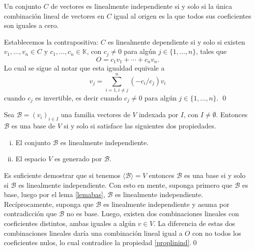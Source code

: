 \begin{prop}\label{proplinind}
Un conjunto $C$ de vectores es linealmente independiente si y solo si la única combinación lineal de vectores en $C$ igual al origen es la que todos sus coeficientes son iguales a cero.
\end{prop}

\dem Establecemos la contrapositiva: $C$ es linealmente dependiente si y solo si existen $v_1,\ldots,v_n\in C$ y $c_1,\ldots,c_n\in \mathbb{K}$, con $c_j\ne 0$ para alg\'un $j\in\{1,\ldots, n\}$, tales que
\[
O=c_1v_1+\cdots+c_nv_n.
\]
Lo cual se sigue al notar que esta igualdad equivale a
\[
v_j=\sum_{i=1,i\ne j}^n (-c_i/c_j)v_i
\]
cuando $c_j$ es invertible, es decir cuando $c_j\ne 0$ para algún $j\in\{1,\ldots,n\}$.
\qed

\begin{teo}\label{defbase2}
Sea $\mathcal{B}=(v_i)_{i\in I}$ una familia vectores de $V$ indexada por $I$, con $I\ne\emptyset$. Entonces $\mathcal{B}$ es una base de $V$ si y solo si satisface las siguientes dos propiedades.
\begin{enumerate}[(i)]
\item El conjunto $\mathcal{B}$ es linealmente independiente.
\item El espacio $V$ es generado por $\mathcal{B}$.
\end{enumerate}
\end{teo}

\dem Es suficiente demostrar que si tenemos $\langle \mathcal{B}\rangle=V$ entonces $\mathcal{B}$ es una base si y solo si $\mathcal{B}$ es linealmente independiente. Con esto en mente, suponga primero que $\mathcal{B}$ es base, luego por el lema \ref{lemabas}, $\mathcal{B}$ es linealmente independiente. Recíprocamente, suponga que $\mathcal{B}$ es linealmente independiente y asuma por contradicci\'on que $\mathcal{B}$ no es base. Luego, existen dos combinaciones lineales con coeficientes distintos, ambas iguales a alg\'un $v\in V$. La diferencia de estas dos combinaciones lineales dar\'ia una combinaci\'on lineal igual a $O$ con no todos los coeficientes nulos, lo cual contradice la propiedad \ref{proplinind}.\qed

